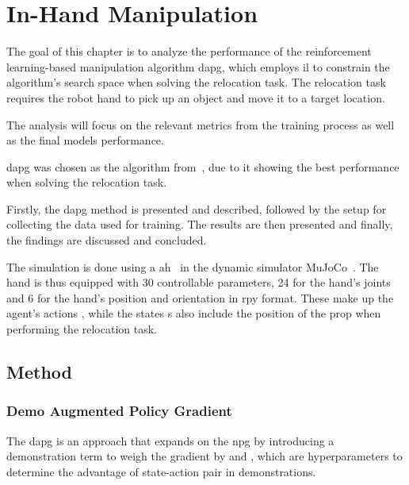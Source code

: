 \chapter{In-Hand Manipulation}\label{ch:3-in-hand-manipulation}

The goal of this chapter is to analyze the performance of the reinforcement learning-based manipulation algorithm \gls{dapg}, which employs \gls{il} to constrain the algorithm's search space when solving the relocation task. The relocation task requires the robot hand to pick up an object and move it to a target location.\medskip 

The analysis will focus on the relevant metrics from the training process as well as the final models performance. \medskip

\gls{dapg} was chosen as the algorithm from~\cite{dexmv:-imitation-learning-for-dexterous-manipulation-from-human-videos}, due to it showing the best performance when solving the relocation task. \medskip

Firstly, the \gls{dapg} method is presented and described, followed by the setup for collecting the data used for training. The results are then presented and finally, the findings are discussed and concluded.\medskip

The simulation is done using a \gls{ah}~\cite{learning-complex-dexterous-manipulation-with-deep-reinforcement-learning-and-demonstrations} in the dynamic simulator MuJoCo~\cite{todorov2012mujoco}. The hand is thus equipped with \num{30} controllable parameters, \num{24} for the hand's joints and \num{6} for the hand's position  and orientation  in \gls{rpy} format. These make up the agent's actions , while the states {s} also include the position of the prop when performing the relocation task.

\section{Method}\label{sec:3-in-hand-manipulation-method}

\subsection{Demo Augmented Policy Gradient}\label{dapg}

The \gls{dapg} is an approach that expands on the \gls{npg} by introducing a demonstration term to weigh the gradient by  and , which are hyperparameters to determine the advantage of state-action pair in demonstrations. \medskip

